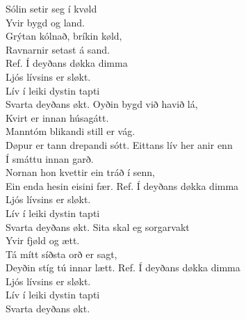 \begin{flushleft}
Sólin setir seg í kvøld\\
Yvir bygd og land.\\
Grýtan kólnað, bríkin køld,\\
Ravnarnir setast á sand.\\
\hops
Ref. Í deyðans døkka dimma\\
\hspace{0.9cm}Ljós lívsins er sløkt.\\
\hspace{0.9cm}Lív í leiki dystin tapti\\
\hspace{0.9cm}Svarta deyðans økt.
\hops
Oyðin bygd við havið lá,\\
Kvirt er innan húsagátt.\\
Manntóm blikandi still er vág.\\
Døpur er tann drepandi sótt.
\hops
Eittans lív her anir enn\\
Í smáttu innan garð.\\
Nornan hon kvettir ein tráð í senn,\\
Ein enda hesin eisini fær.
\hops
Ref. Í deyðans døkka dimma\\
\hspace{0.9cm}Ljós lívsins er sløkt.\\
\hspace{0.9cm}Lív í leiki dystin tapti\\
\hspace{0.9cm}Svarta deyðans økt.
\hops
Sita skal eg sorgarvakt\\
Yvir fjøld og ætt.\\
Tá mítt síðsta orð er sagt,\\
Deyðin stíg tú innar lætt.
\hops
Ref. Í deyðans døkka dimma\\
\hspace{0.9cm}Ljós lívsins er sløkt.\\
\hspace{0.9cm}Lív í leiki dystin tapti\\
\hspace{0.9cm}Svarta deyðans økt.
\end{flushleft}
\newpage


